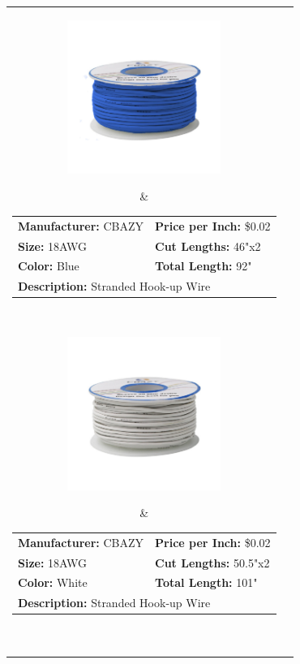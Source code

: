 \documentclass[12pt,letterpaper]{article}
\begin{document}
\begin{longtable}{c l}
\parbox[c]{5cm}{\includegraphics[width=5cm]{bluewire.jpg} }
& \begin{tabular}{l l}
\textbf{Manufacturer:} CBAZY & \textbf{Price per Inch:} \$0.02 \\
\textbf{Size:} 18AWG & \textbf{Cut Lengths:} 46"x2 \\
\textbf{Color:} Blue  & \textbf{Total Length:} 92" \\
\multicolumn{2}{p{8cm}}{\textbf{Description:} Stranded Hook-up Wire } \\
\end{tabular} \\

\parbox[c]{5cm}{\includegraphics[width=5cm]{whitewire.jpg} }
& \begin{tabular}{l l}
\textbf{Manufacturer:} CBAZY & \textbf{Price per Inch:} \$0.02 \\
\textbf{Size:} 18AWG & \textbf{Cut Lengths:} 50.5"x2 \\
\textbf{Color:} White  & \textbf{Total Length:} 101" \\
\multicolumn{2}{p{8cm}}{\textbf{Description:} Stranded Hook-up Wire } \\
\end{tabular} \\


\end{longtable}
\end{document}
